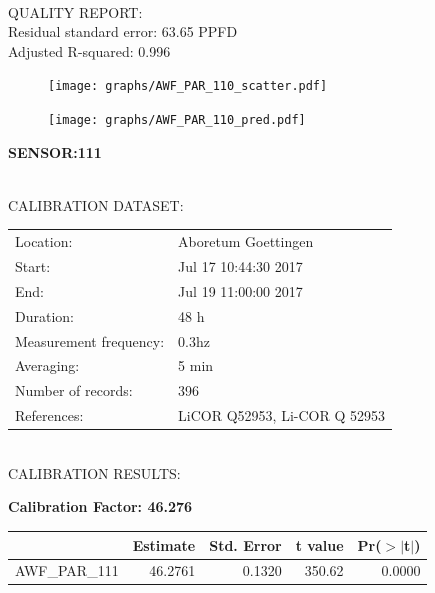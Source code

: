 \documentclass[oneside]{report}
\begin{document}
\hrulefill\\
QUALITY REPORT:\\
Residual standard error: 63.65 PPFD\\
Adjusted R-squared: 0.996



\begin{figure}[H]
  \centering
  \texttt{[image: graphs/AWF\_PAR\_110\_scatter.pdf]}
\end{figure}




\begin{figure}[H]
  \centering
  \texttt{[image: graphs/AWF\_PAR\_110\_pred.pdf]}
\end{figure}

\pagebreak


\begin{center}
\large{\textbf{SENSOR:111}}\\
\end{center}

\hrulefill\\
CALIBRATION DATASET:\\
\begin{table}[h!]
  \centering
  \label{tab:table1}
  \begin{tabular}{ll}
    Location: & Aboretum Goettingen\\ 
    
    
    Start:  & Jul 17 10:44:30 2017 \\
    End:   & Jul 19 11:00:00 2017\\ 
    Duration: & 48 h\\
    Measurement frequency: & 0.3hz\\
    Averaging:  &5 min\\
    Number of records: & 396 \\
    References: & LiCOR Q52953, Li-COR Q 52953 \\
  \end{tabular}
\end{table}

\hrulefill\\
CALIBRATION RESULTS:\\


\begin{center}
\textbf{\large{Calibration Factor: 46.276}}\\
\end{center}
\begin{table}[ht]
\centering
\begin{tabular}{rrrrr}
  \hline
 & Estimate & Std. Error & t value & Pr($>$$|$t$|$) \\ 
  \hline
AWF\_PAR\_111 & 46.2761 & 0.1320 & 350.62 & 0.0000 \\ 
   \hline
\end{tabular}
\end{table}
\end{document}
